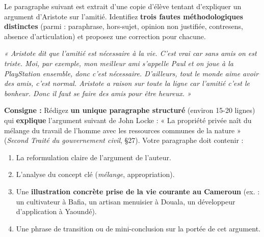 \documentclass[11pt]{article}
\newcommand{\cle}[1]{{\popxbold\color{popdark}#1}}
\newcounter{popsec}
\newcounter{popsub}
\newcommand{\courssub}[1]{%
  \stepcounter{popsub}%
  \par\vspace{9pt}\noindent{\popxbold\fontsize{11.5}{13}\selectfont\color{popink}{\color{poporange}\thepopsec.\thepopsub}\hspace{6pt}#1}\par\nopagebreak\vspace{4pt}
}
\begin{document}
\begin{exercice}
Le paragraphe suivant est extrait d'une copie d'élève tentant d'expliquer un argument d'Aristote sur l'amitié. Identifiez \textbf{trois fautes méthodologiques distinctes} (parmi : paraphrase, hors-sujet, opinion non justifiée, contresens, absence d'articulation) et proposez une correction pour chacune.

\textit{« Aristote dit que l'amitié est nécessaire à la vie. C'est vrai car sans amis on est triste. Moi, par exemple, mon meilleur ami s'appelle Paul et on joue à la PlayStation ensemble, donc c'est nécessaire. D'ailleurs, tout le monde aime avoir des amis, c'est normal. Aristote a raison sur toute la ligne car l'amitié c'est le bonheur. Donc il faut se faire des amis pour être heureux. »}
\end{exercice}

\begin{exercice}
\textbf{Consigne :} Rédigez \textbf{un unique paragraphe structuré} (environ 15-20 lignes) qui \textbf{explique} l'argument suivant de John Locke : « La propriété privée naît du mélange du travail de l'homme avec les ressources communes de la nature » (\emph{Second Traité du gouvernement civil}, §27).
Votre paragraphe doit contenir :
\begin{enumerate}
\item La reformulation claire de l'argument de l'auteur.
\item L'analyse du concept clé (\emph{mélange}, \cle{appropriation}).
\item Une \textbf{illustration concrète prise de la vie courante au Cameroun} (ex. : un cultivateur à Bafia, un artisan menuisier à Douala, un développeur d'application à Yaoundé).
\item Une phrase de transition ou de mini-conclusion sur la portée de cet argument.
\end{enumerate}
\end{exercice}

\courssub{Je me prépare au Bac}
\end{document}
